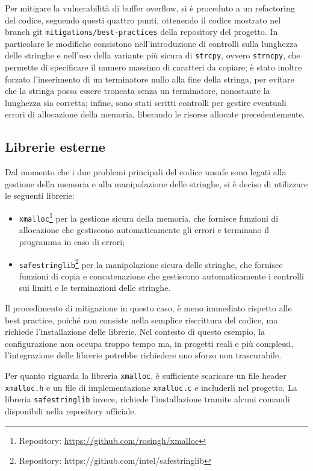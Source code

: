 Per mitigare la vulnerabilità di buffer overflow, si è proceduto a un refactoring
del codice, seguendo questi quattro punti, ottenendo il codice mostrato nel branch
git \texttt{mitigations/best-practices} della repository del progetto. In particolare
le modifiche consistono nell'introduzione di controlli sulla lunghezza delle stringhe
e nell'uso della variante più sicura di \texttt{strcpy}, ovvero \texttt{strncpy},
che permette di specificare il numero massimo di caratteri da copiare; è stato
inoltre forzato l'inserimento di un terminatore nullo alla fine della stringa, per
evitare che la stringa possa essere troncata senza un terminatore, nonostante la
lunghezza sia corretta; infine, sono stati scritti controlli per gestire
eventuali errori di allocazione della memoria, liberando le risorse allocate precedentemente.

\subsection*{Librerie esterne}
\label{sec:librerie-case-study}

Dal momento che i due problemi principali del codice unsafe sono legati alla
gestione della memoria e alla manipolazione delle stringhe, si è deciso di utilizzare
le seguenti librerie:
\begin{itemize}
  \item \texttt{xmalloc}\footnote{Repository: \url{https://github.com/rosingh/xmalloc}}
    per la gestione sicura della memoria, che fornisce funzioni di allocazione
    che gestiscono automaticamente gli errori e terminano il programma in caso
    di errori;

  \item \texttt{safestringlib}\footnote{Repository: https://github.com/intel/safestringlib}
    per la manipolazione sicura delle stringhe, che fornisce funzioni di copia e
    concatenazione che gestiscono automaticamente i controlli sui limiti e le
    terminazioni delle stringhe.
\end{itemize}

Il procedimento di mitigazione in questo caso, è meno immediato rispetto alle
best practice, poiché non consiste nella semplice riscrittura del codice, ma
richiede l'installazione delle librerie. Nel contesto di questo esempio, la
configurazione non occupa troppo tempo ma, in progetti reali e più complessi, l'integrazione
delle librerie potrebbe richiedere uno sforzo non trascurabile.

Per quanto riguarda la libreria \texttt{xmalloc}, è sufficiente scaricare un
file header \texttt{xmalloc.h} e un file di implementazione \texttt{xmalloc.c} e
includerli nel progetto. La libreria \texttt{safestringlib} invece, richiede l'installazione
tramite alcuni comandi disponibili nella repository ufficiale.

